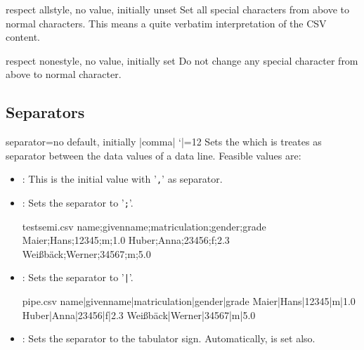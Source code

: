 \documentclass[a4paper,11pt]{ltxdoc}
\begin{document}
\begin{docCsvKey}{respect all}{}{style, no value, initially unset}
  Set all special characters from above to normal characters. This means
  a quite verbatim interpretation of the CSV content.
\end{docCsvKey}

\begin{docCsvKey}{respect none}{}{style, no value, initially set}
  Do not change any special character from above to normal character.
\end{docCsvKey}

\clearpage
\subsection{Separators}%
\begin{docCsvKey}{separator}{=}{no default, initially |comma|}
  \catcode `|=12
  Sets the  which is treates as separator between the data values
  of a data line. Feasible values are:
  \begin{itemize}
  \item{}: This is the initial value with '\texttt{,}' as separator.
  \medskip

  \item{}: Sets the separator to '\texttt{;}'.
\begin{dispExample}
\begin{tcbverbatimwrite}{testsemi.csv}
  name;givenname;matriculation;gender;grade
  Maier;Hans;12345;m;1.0
  Huber;Anna;23456;f;2.3
  Wei\ss{}b\"{a}ck;Werner;34567;m;5.0
\end{tcbverbatimwrite}

\end{dispExample}
\medskip

\item{}: Sets the separator to '\texttt{|}'.
\begin{dispExample}
\begin{tcbverbatimwrite}{pipe.csv}
  name|givenname|matriculation|gender|grade
  Maier|Hans|12345|m|1.0
  Huber|Anna|23456|f|2.3
  Wei\ss{}b\"{a}ck|Werner|34567|m|5.0
\end{tcbverbatimwrite}

\end{dispExample}
\medskip

\item{}: Sets the separator to the tabulator sign.
  Automatically,  is set also.
  \end{itemize}
\end{docCsvKey}
\end{document}
